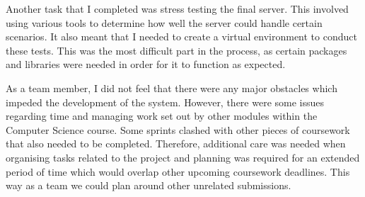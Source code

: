 Another task that I completed was stress testing the final server. This involved using various tools to determine how well the server could handle certain scenarios. It also meant that I needed to create a virtual environment to conduct these tests. This was the most difficult part in the process, as certain packages and libraries were needed in order for it to function as expected.

As a team member, I did not feel that there were any major obstacles which impeded the development of the system. However, there were some issues regarding time and managing work set out by other modules within the Computer Science course. Some sprints clashed with other pieces of coursework that also needed to be completed. Therefore, additional care was needed when organising tasks related to the project and planning was required for an extended period of time which would overlap other upcoming coursework deadlines. This way as a team we could plan around other unrelated submissions.

